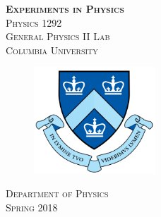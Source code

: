 \begin{titlepage}
\begin{center}
\textsc{\Huge\bf Experiments in Physics}
\\[5cm]
\textsc{\huge Physics 1292}
\\[0.3cm]
\textsc{\huge General Physics II Lab}
\\[4cm]
\textsc{\large Columbia University}
\\[0.5cm]
\begin{figure}[h]
  \centering
  \includegraphics[height=4cm]{./pic/Columbia-Logo.png}
\end{figure}
\textsc{Department of Physics}
\\[1cm]
\textsc{Spring 2018}
\end{center}
\end{titlepage}
